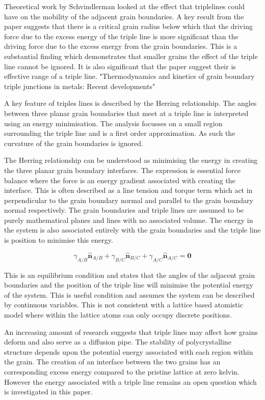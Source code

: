 \documentclass[12pt,a4paper]{book}
\begin{document}
Theoretical work by Schvindlerman looked at the effect that triplelines could have on the mobility of the adjacent grain boundaries. A key result from the paper suggests that there is a critical grain radius below which that the driving force due to the excess energy of the triple line is more significant than the driving force due to the excess energy from the grain boundaries. This is a substantial finding which demonstrates that smaller grains the effect of the triple line cannot be ignored. It is also significant that the paper suggest their is effective range of a triple line.  "Thermodynamics and kinetics of grain boundary triple junctions in metals: Recent developments"

A key feature of triples lines is described by the Herring relationship. The angles between three planar grain boundaries that meet at a triple line is interpreted using an energy minimisation. The analysis focusses on a small region surrounding
the triple line and is a first order approximation. As such the curvature of the grain boundaries is ignored.

The Herring relationship can be understood as minimising the energy in creating the three planar grain boundary interfaces. The expression is essential force balance where the force is an energy gradient associated with creating the interface. This is often described as a line tension and torque term which act in perpendicular to the grain boundary normal and parallel to the grain boundary normal respectively. The grain boundaries and triple lines are assumed to be purely mathematical planes and lines with no associated volume. The energy in the system is also associated entirely with the grain boundaries and the triple line is position to minimise this energy. 

\[\gamma_{A/B}\mathbf{\hat{n}}_{A/B} + \gamma_{B/C}\mathbf{\hat{n}}_{B/C} + \gamma_{A/C}\mathbf{\hat{n}}_{A/C} =\mathbf{0} \]

This is an equilibrium condition and states that the angles of the adjacent grain boundaries and the position of the triple line will minimise the potential energy of the system. This is useful condition and assumes the system can be described by continuous variables. This is not consistent with a lattice based atomistic model where within the lattice atoms can only occupy discrete positions.     

An increasing amount of research suggests that triple lines may affect how  grains deform and also serve as a diffusion pipe. The stability of polycrystalline structure depends upon the potential energy associated with each region within the grain. The creation of an interface between the two grains has an corresponding excess energy compared to the pristine lattice at zero kelvin. However the energy associated with a triple line remains an open question which is investigated in this paper.
\end{document}
